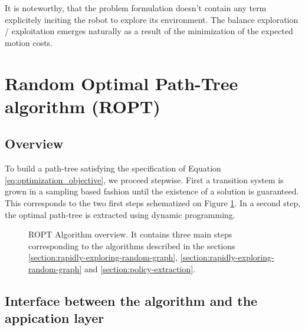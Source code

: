 \documentclass[letterpaper, 10 pt, conference]{ieeeconf}  %
\begin{document}
It is noteworthy, that the problem formulation doesn't contain any term explicitely inciting the robot to explore its environment. The balance exploration / exploitation emerges naturally as a result of the minimization of the expected motion costs.
\section{Random Optimal Path-Tree algorithm (ROPT)}

\subsection{Overview}

To build a path-tree satisfying the specification of Equation \ref{eq:optimization_objective}, we proceed stepwise. First a transition system is grown in a sampling based fashion until the existence of a solution is guaranteed. This corresponds to the two first steps schematized on Figure \ref{algorithm_overview}. In a second step, the optimal path-tree is extracted using dynamic programming. 

\begin{figure}[!htb]
\scriptsize
{}
 \caption{ROPT Algorithm overview. It contains three main steps corresponding to the algorithms described in the sections \ref{section:rapidly-exploring-random-graph}, \ref{section:rapidly-exploring-random-graph} and \ref{section:policy-extraction}.}
 \label{algorithm_overview}
\end{figure}

\subsection{Interface between the algorithm and the appication layer}
\end{document}
